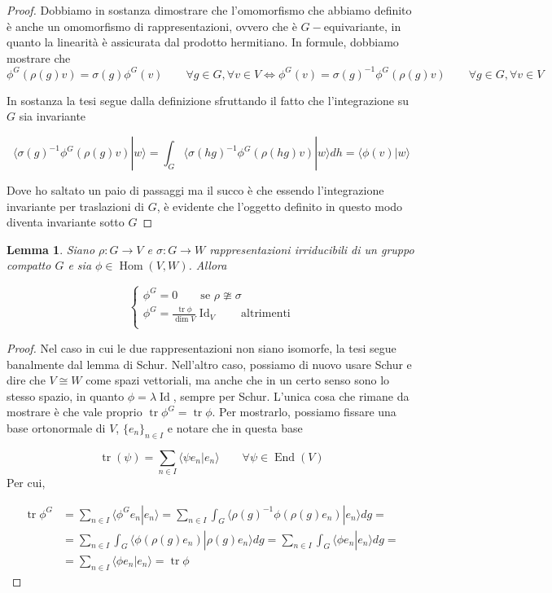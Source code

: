 \documentclass[11pt]{article}
\theoremstyle{plain}
\newtheorem{lemma}[thm]{Lemma}
\theoremstyle{definition}
\theoremstyle{remark}
\newcommand{\dsum}{\displaystyle\sum}
\newcommand{\dint}{\displaystyle\int}
\DeclareMathOperator{\tr}{tr}
\DeclareMathOperator{\Hom}{Hom}
\DeclareMathOperator{\End}{End}
\DeclareMathOperator{\Id}{Id}
\begin{document}
 \begin{proof}
   Dobbiamo in sostanza dimostrare che l'omomorfismo che abbiamo definito è anche un omomorfismo di rappresentazioni, ovvero che è $G-$equivariante, in quanto la linearità è assicurata dal prodotto hermitiano. In formule, dobbiamo mostrare che
   \[ \phi^G (\rho(g) v) = \sigma(g) \phi^G(v) \qquad \forall g \in G, \forall v \in V \Leftrightarrow \phi^G(v) = \sigma(g) ^{-1} \phi^G(\rho(g) v) \qquad \forall g \in G, \forall v \in V \]

   In sostanza la tesi segue dalla definizione sfruttando il fatto che l'integrazione su $G$ sia invariante


   \[ \langle \sigma(g) ^{-1} \phi^G(\rho(g) v) | w \rangle  = \dint_G \langle \sigma(hg) ^{-1} \phi^G(\rho(hg) v) | w \rangle dh = \langle \phi(v) | w \rangle\]

   Dove ho saltato un paio di passaggi ma il succo è che essendo l'integrazione invariante per traslazioni di $G$, è evidente che l'oggetto definito in questo modo diventa invariante sotto $G$
 \end{proof}

 \begin{lemma}
   Siano $\rho: G \to V$ e $\sigma: G \to W$ rappresentazioni irriducibili di un gruppo compatto $G$ e sia $\phi \in \Hom(V, W)$. Allora

   \[
   \begin{cases}
     \phi^G = 0 \qquad \text{se } \rho \ncong \sigma \\
     \phi^G = \frac{\tr \phi}{\dim V}\Id_V \qquad \text{altrimenti} \\
   \end{cases}
   \]

 \end{lemma}

 \begin{proof}
   Nel caso in cui le due rappresentazioni non siano isomorfe, la tesi segue banalmente dal lemma di Schur. Nell'altro caso, possiamo di nuovo usare Schur e dire che $V \cong W$ come spazi vettoriali, ma anche che in un certo senso sono lo stesso spazio, in quanto $\phi = \lambda \Id$, sempre per Schur. L'unica cosa che rimane da mostrare è che vale proprio $\tr \phi^G = \tr \phi$. Per mostrarlo, possiamo fissare una base ortonormale di $V$, $\{ e_n\}_{n\in I}$ e notare che in questa base

   \[ \tr(\psi) = \dsum_{n \in I}\langle \psi e_n | e_n \rangle \qquad \forall \psi \in \End(V)\]
   Per cui,

   \begin{align*} \tr \phi^G &= \dsum_{n \in I}\langle \phi^G e_n | e_n \rangle = \dsum_{n \in I} \dint_G \langle \rho(g)^{-1} \phi(\rho(g) e_n) | e_n \rangle dg = \\
     &= \dsum_{n \in I}\dint_G \langle \phi(\rho(g) e_n) | \rho(g) e_n \rangle  dg = \dsum_{n \in I} \dint_G \langle \phi e_n |  e_n \rangle dg = \\
     &= \dsum_{n\in I} \langle \phi e_n | e_n \rangle = \tr \phi
   \end{align*}


 \end{proof}
\end{document}
